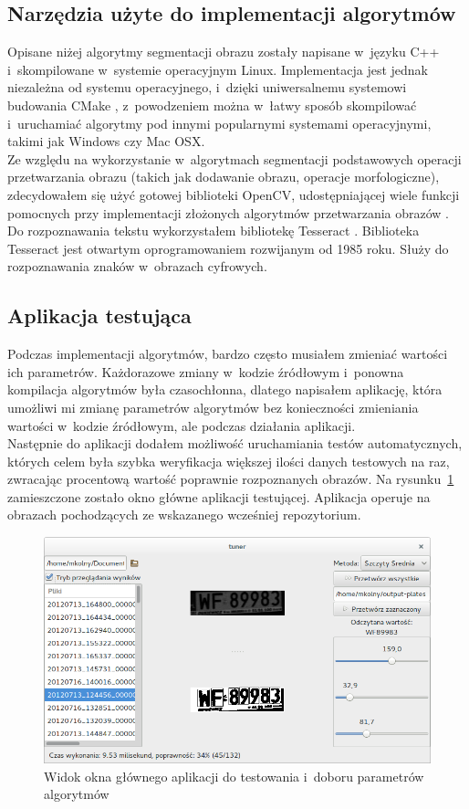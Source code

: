 \subsection{Narzędzia użyte do implementacji algorytmów}
Opisane niżej algorytmy segmentacji obrazu zostały napisane w~języku C++ i~skompilowane w~systemie operacyjnym Linux. Implementacja jest jednak niezależna od systemu operacyjnego, i~dzięki uniwersalnemu systemowi budowania CMake \cite{cmake}, z~powodzeniem można w~łatwy sposób skompilować i~uruchamiać algorytmy pod innymi popularnymi systemami operacyjnymi, takimi jak Windows czy Mac OSX.\\
Ze względu na wykorzystanie w~algorytmach segmentacji podstawowych operacji przetwarzania obrazu (takich jak dodawanie obrazu, operacje morfologiczne), zdecydowałem się użyć gotowej biblioteki OpenCV, udostępniającej wiele funkcji pomocnych przy implementacji złożonych algorytmów przetwarzania obrazów \cite{opencv}\cite{dawsonhowe14}.\\
Do rozpoznawania tekstu wykorzystałem bibliotekę Tesseract \cite{tesseract}. Biblioteka Tesseract jest otwartym oprogramowaniem rozwijanym od 1985 roku. Służy do rozpoznawania znaków w~obrazach cyfrowych.
\subsection{Aplikacja testująca}
Podczas implementacji algorytmów, bardzo często musiałem zmieniać wartości ich parametrów. Każdorazowe zmiany w~kodzie źródłowym i~ponowna kompilacja algorytmów była czasochłonna, dlatego napisałem aplikację, która umożliwi mi zmianę parametrów algorytmów bez konieczności zmieniania wartości w~kodzie źródłowym, ale podczas działania aplikacji.\\
Następnie do aplikacji dodałem możliwość uruchamiania testów automatycznych, których celem była szybka weryfikacja większej ilości danych testowych na raz, zwracając procentową wartość poprawnie rozpoznanych obrazów. Na rysunku~\ref{fig:tuner_screenshot} zamieszczone zostało okno główne aplikacji testującej. Aplikacja operuje na obrazach pochodzących ze wskazanego wcześniej repozytorium.

\begin{figure}
  \centering
  \includegraphics[width=1\textwidth]{img/tuner-screenshot}
  \caption{Widok okna głównego aplikacji do testowania i~doboru parametrów algorytmów}
  \label{fig:tuner_screenshot}
\end{figure}

